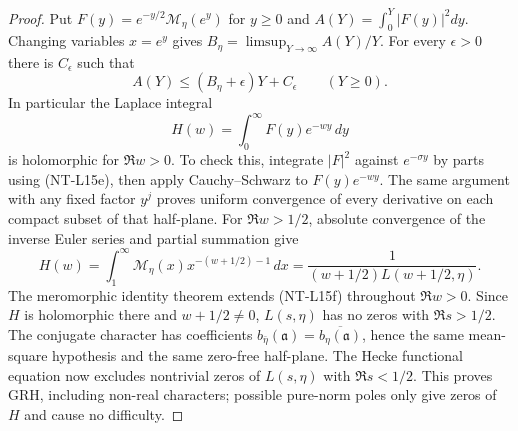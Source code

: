 \documentclass[11pt,a4paper]{article}
\begin{document}
\begin{proof}
Put $F(y)=e^{-y/2}\mathcal M_\eta(e^y)$ for $y\ge0$ and
$A(Y)=\int_0^Y|F(y)|^2dy$. Changing variables $x=e^y$ gives
$B_\eta=\limsup_{Y\to\infty}A(Y)/Y$.
For every $\epsilon>0$ there is $C_\epsilon$ such that
\[
 A(Y)\le (B_\eta+\epsilon)Y+C_\epsilon\qquad(Y\ge0).
                                                        \tag{NT-L15e}
\]
In particular the Laplace integral
\[
 H(w)=\int_0^\infty F(y)e^{-wy}\,dy
\]
is holomorphic for $\Re w>0$. To check this, integrate $|F|^2$ against
$e^{-\sigma y}$ by parts using (NT-L15e), then apply Cauchy--Schwarz to
$F(y)e^{-wy}$. The same argument with any fixed factor $y^j$ proves
uniform convergence of every derivative on each compact subset of that
half-plane. For $\Re w>1/2$, absolute convergence of the inverse Euler
series and partial summation give
\[
 H(w)=\int_1^\infty\mathcal M_\eta(x)x^{-(w+1/2)-1}\,dx
      =\frac1{(w+1/2)L(w+1/2,\eta)}.                    \tag{NT-L15f}
\]
The meromorphic identity theorem extends (NT-L15f) throughout $\Re w>0$.
Since $H$ is holomorphic there and $w+1/2\ne0$, $L(s,\eta)$ has no zeros
with $\Re s>1/2$. The conjugate character has coefficients
$b_{\bar\eta}(\mathfrak a)=\overline{b_\eta(\mathfrak a)}$, hence the
same mean-square hypothesis and the same zero-free half-plane.
The Hecke functional equation now excludes nontrivial zeros of
$L(s,\eta)$ with $\Re s<1/2$. This proves GRH, including non-real
characters; possible pure-norm poles only give zeros of $H$ and cause
no difficulty.


\end{proof}
\end{document}

